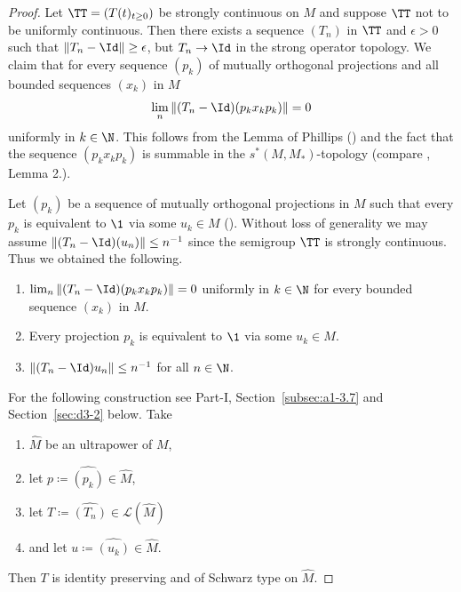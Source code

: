 \begin{proof}
Let $\TT = (T(t)_{t \geq 0})$ be strongly continuous on $M$ and suppose $\TT$ not to be uniformly continuous.
Then there exists a sequence $(T_n)$  in  $ \TT $ and $\epsilon > 0$ such that $\|T_n - \Id\| \geq \epsilon$, 
but $T_n \to \Id$ in the strong operator topology.
We claim that for every sequence $(p_{k})$ of mutually orthogonal projections and all bounded sequences $(x_{k})$ 
in $M$
\[
\lim_n \|(T_n - \Id)(p_{k} x_{k} p_{k})\| = 0
\]
uniformly in $k \in \N$.
This follows from the {Lemma of Phillips} (\textcite[Lemma II.10.3]{schaefer:1974}) and the fact that the sequence $(p_{k} x_{k} p_{k})$ is summable in the $s^{*}(M,M_*)$-topology (compare \textcite{elliot:1972}, Lemma 2.).

Let $(p_{k})$ be a sequence of mutually orthogonal projections in $M$ such that every $p_{k}$ is equivalent to $\1$ via some $u_{k} \in M$ (\textcite[2.2]{sakai:1971}).
Without loss of generality we may assume $\|(T_n - \Id)(u_n)\| \leq n^{-1}$ since the semigroup $\TT$ is strongly continuous.
Thus we obtained the following.
\begin{enumerate}[\upshape (i)]
\item 
$\lim_n \|(T_n - \Id)(p_{k} x_{k} p_{k})\| = 0$ uniformly in $k \in \N$ for every bounded sequence $(x_{k})$ in $M$.
\item 
Every projection $p_{k}$ is equivalent to $\1$ via some $u_{k} \in M$.
\item 
$\|(T_n - \Id)u_n\| \leq n^{-1}$ for all $n \in \N$.
\end{enumerate}
For the following construction see Part-I, Section~\ref{subsec:a1-3.7} and Section~\ref{sec:d3-2} below.
Take
\begin{enumerate}[\upshape (i)']
\item
$\widehat{M}$ be an ultrapower of\/ $M$,

\item
let $p \coloneq \widehat{(p_{k})} \in \widehat{M}$,

\item
let $T \coloneq \widehat{(T_{n}) }\in \mathcal{L}(\widehat{M})$

\item
and let $u \coloneq \widehat{(u_{k})}  \in \widehat{M}$.

\end{enumerate}
Then $T$ is identity preserving and of Schwarz type on $\widehat{M}$.


\end{proof}
